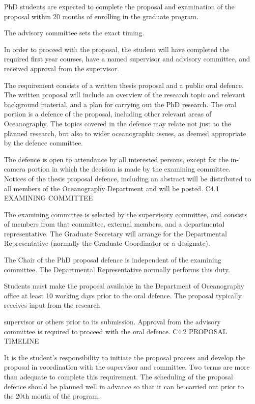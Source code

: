 PhD students are expected to complete the proposal and examination of the proposal within 20 months of enrolling in the graduate program.

The advisory committee sets the exact timing.

In order to proceed with the proposal, the student will have completed the required first year courses, have a named supervisor and advisory committee, and received approval from the supervisor.

The requirement consists of a written thesis proposal and a public oral defence.  The written proposal will include an overview of the research topic and relevant background material, and a plan for carrying out the PhD research. The oral portion is a defence of the proposal, including other relevant areas of Oceanography. The topics covered in the defence may relate not just to the planned research, but also to wider oceanographic issues, as deemed appropriate by the defence committee.

The defence is open to attendance by all interested persons, except for the in-camera portion in which the decision is made by the examining committee. Notices of the thesis proposal defence, including an abstract will be distributed to all members of the Oceanography Department and will be posted.
C4.1	EXAMINING COMMITTEE

The examining committee is selected by the supervisory committee, and consists of members from that committee, external members, and a departmental representative. The Graduate Secretary will arrange for the Departmental Representative (normally the Graduate Coordinator or a designate).

The Chair of the PhD proposal defence is independent of the examining committee. The Departmental Representative normally performs this duty.

Students must make the proposal available in the Department of Oceanography office at least 10 working days prior to the oral defence.  The proposal typically receives input from the research
 

supervisor or others prior to its submission. Approval from the advisory committee is required to proceed with the oral defence.
C4.2	PROPOSAL TIMELINE

It is the student's responsibility to initiate the proposal process and develop the proposal in coordination with the supervisor and committee. Two terms are more than adequate to complete this requirement. The scheduling of the proposal defence should be planned well in advance so that it can be carried out prior to the 20th month of the program.

